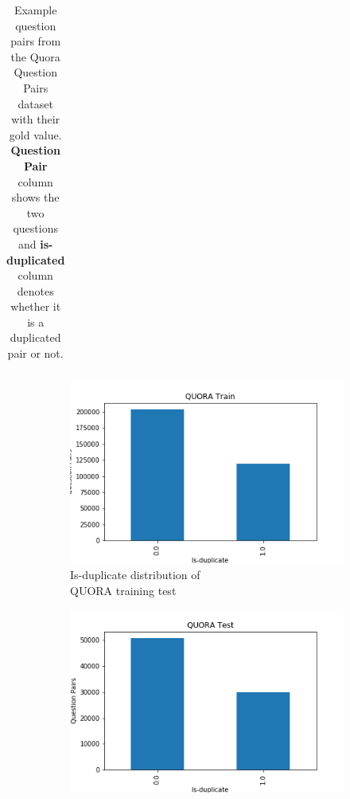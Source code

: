 \begin{enumerate}
\begin{table}[ht!]
\begin{tabular}{l|c}
 	\end{tabular}
 	\caption[Example question pairs from the Quora Question Pairs dataset]{Example question  pairs from the Quora Question Pairs dataset with their gold  value. \textbf{Question Pair} column shows the two questions and \textbf{is-duplicated} column denotes whether it is a duplicated pair or not.}
 	\label{tab:quoradata}
 \end{table}  


\begin{figure}
	\captionsetup[subfigure]{justification=centering}
	\centering
	\begin{subfigure}[b]{.5\textwidth}
		\centering
		\includegraphics[width=\textwidth]{figures/semantic_textual_similarity/introduction/quora_train.png}
		\caption{Is-duplicate distribution of \\ QUORA training test}
		\label{fig:quora_train_is_duplicate}
	\end{subfigure}%
	\begin{subfigure}[b]{.5\textwidth}
		\centering
		\includegraphics[width=\textwidth]{figures/semantic_textual_similarity/introduction/quora_test.png}

\end{subfigure}
\end{figure}
\end{enumerate}
